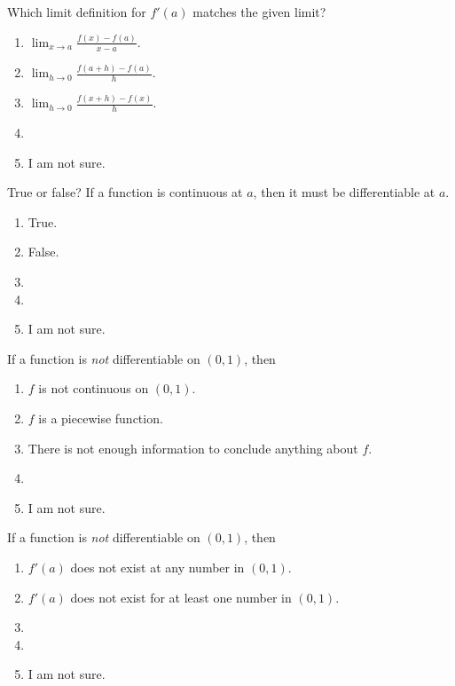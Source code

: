 \documentclass[aspectratio=169, 14pt, t]{beamer}  %
\begin{document}
\begin{poll}
  Which limit definition for \(f'(a)\) matches the given limit?

  \begin{enumerate}
    \item \(\lim_{x \to a} \frac{f(x) - f(a)}{x - a}\).
    \item \(\lim_{h \to 0} \frac{f(a + h) - f(a)}{h}\).
    \item \(\lim_{h \to 0} \frac{f(x + h) - f(x)}{h}\).
    \item
    \item I am not sure.
  \end{enumerate}
\end{poll}

\begin{poll}
  True or false? If a function is continuous at \(a\), then it must be differentiable at \(a\).

  \begin{enumerate}
    \item True.
    \item False.
    \item
    \item
    \item I am not sure.
  \end{enumerate}
\end{poll}

\begin{poll}
  If a function is \emph{not} differentiable on \((0,1)\), then

  \begin{enumerate}
    \item \(f\) is not continuous on \((0,1)\).
    \item \(f\) is a piecewise function.
    \item There is not enough information to conclude anything about \(f\).
    \item
    \item I am not sure.
  \end{enumerate}
\end{poll}

\begin{poll}
  If a function is \emph{not} differentiable on \((0,1)\), then

  \begin{enumerate}
    \item \(f'(a)\) does not exist at any number in \((0,1)\).
    \item \(f'(a)\) does not exist for at least one number in \((0,1)\).
    \item
    \item
    \item I am not sure.
  \end{enumerate}
\end{poll}
\end{document}
